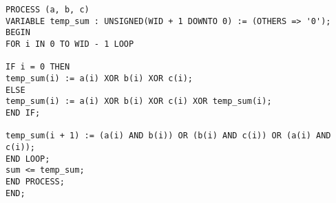 \documentclass{article}
\begin{document}
\begin{enumerate}
\begin{verbatim}
PROCESS (a, b, c)
VARIABLE temp_sum : UNSIGNED(WID + 1 DOWNTO 0) := (OTHERS => '0');
BEGIN
FOR i IN 0 TO WID - 1 LOOP

IF i = 0 THEN
temp_sum(i) := a(i) XOR b(i) XOR c(i);
ELSE
temp_sum(i) := a(i) XOR b(i) XOR c(i) XOR temp_sum(i);
END IF;

temp_sum(i + 1) := (a(i) AND b(i)) OR (b(i) AND c(i)) OR (a(i) AND c(i));
END LOOP;
sum <= temp_sum;
END PROCESS;
END;
  \end{verbatim}

\end{enumerate}
\end{document}
